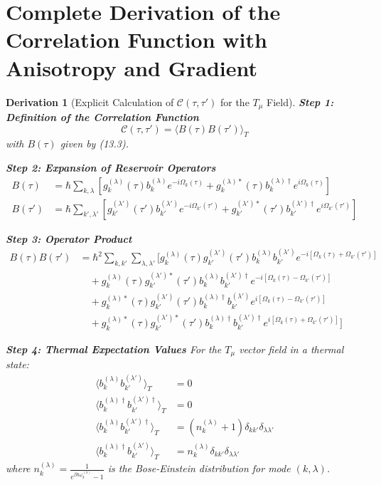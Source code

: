 \documentclass[10pt, a4paper]{article}
\newtheorem{derivation}{Derivation}
\begin{document}
\section{Complete Derivation of the Correlation Function with Anisotropy and Gradient}

\begin{derivation}[Explicit Calculation of $\mathcal{C}(\tau, \tau')$ for the $T_\mu$ Field]
\textbf{Step 1: Definition of the Correlation Function}
\begin{equation}
\mathcal{C}(\tau, \tau') = \langle B(\tau) B(\tau') \rangle_T
\tag{15.1}
\end{equation}
with $B(\tau)$ given by (13.3).

\textbf{Step 2: Expansion of Reservoir Operators}
\begin{align}
B(\tau) &= \hbar \sum_{k,\lambda} \left[ g_{k}^{(\lambda)}(\tau) b_{k}^{(\lambda)} e^{-i\Omega_k(\tau)} + g_{k}^{(\lambda)*}(\tau) b_{k}^{(\lambda)\dagger} e^{i\Omega_k(\tau)} \right]
\tag{15.2} \\
B(\tau') &= \hbar \sum_{k',\lambda'} \left[ g_{k'}^{(\lambda')}(\tau') b_{k'}^{(\lambda')} e^{-i\Omega_{k'}(\tau')} + g_{k'}^{(\lambda')*}(\tau') b_{k'}^{(\lambda')\dagger} e^{i\Omega_{k'}(\tau')} \right]
\tag{15.3}
\end{align}

\textbf{Step 3: Operator Product}
\begin{align}
B(\tau)B(\tau') &= \hbar^2 \sum_{k,k'} \sum_{\lambda,\lambda'} \big[ g_{k}^{(\lambda)}(\tau) g_{k'}^{(\lambda')}(\tau') b_{k}^{(\lambda)} b_{k'}^{(\lambda')} e^{-i[\Omega_k(\tau)+\Omega_{k'}(\tau')]} \\
&\quad + g_{k}^{(\lambda)}(\tau) g_{k'}^{(\lambda')*}(\tau') b_{k}^{(\lambda)} b_{k'}^{(\lambda')\dagger} e^{-i[\Omega_k(\tau)-\Omega_{k'}(\tau')]} \\
&\quad + g_{k}^{(\lambda)*}(\tau) g_{k'}^{(\lambda')}(\tau') b_{k}^{(\lambda)\dagger} b_{k'}^{(\lambda')} e^{i[\Omega_k(\tau)-\Omega_{k'}(\tau')]} \\
&\quad + g_{k}^{(\lambda)*}(\tau) g_{k'}^{(\lambda')*}(\tau') b_{k}^{(\lambda)\dagger} b_{k'}^{(\lambda')\dagger} e^{i[\Omega_k(\tau)+\Omega_{k'}(\tau')]} \big]
\tag{15.4}
\end{align}

\textbf{Step 4: Thermal Expectation Values}
For the $T_\mu$ vector field in a thermal state:
\begin{align}
\langle b_{k}^{(\lambda)} b_{k'}^{(\lambda')} \rangle_T &= 0
\tag{15.5} \\
\langle b_{k}^{(\lambda)\dagger} b_{k'}^{(\lambda')\dagger} \rangle_T &= 0
\tag{15.6} \\
\langle b_{k}^{(\lambda)} b_{k'}^{(\lambda')\dagger} \rangle_T &= (n_k^{(\lambda)} + 1) \delta_{kk'} \delta_{\lambda\lambda'}
\tag{15.7} \\
\langle b_{k}^{(\lambda)\dagger} b_{k'}^{(\lambda')} \rangle_T &= n_k^{(\lambda)} \delta_{kk'} \delta_{\lambda\lambda'}
\tag{15.8}
\end{align}
where $n_k^{(\lambda)} = \frac{1}{e^{\beta\hbar\omega_k^{(\lambda)}} - 1}$ is the Bose-Einstein distribution for mode $(k,\lambda)$.


\end{derivation}
\end{document}
